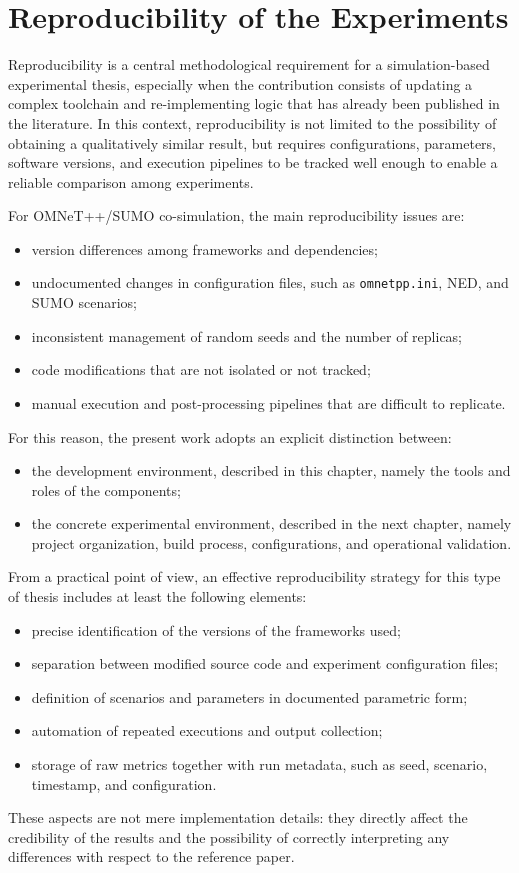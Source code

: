 \section{Reproducibility of the Experiments}
\label{env:reproducibility}

Reproducibility is a central methodological requirement for a simulation-based experimental thesis, especially when the contribution consists of updating a complex toolchain and re-implementing logic that has already been published in the literature. In this context, reproducibility is not limited to the possibility of obtaining a qualitatively similar result, but requires configurations, parameters, software versions, and execution pipelines to be tracked well enough to enable a reliable comparison among experiments.

For OMNeT++/SUMO co-simulation, the main reproducibility issues are:
\begin{itemize}
\item version differences among frameworks and dependencies;
\item undocumented changes in configuration files, such as \texttt{omnetpp.ini}, NED, and SUMO scenarios;
\item inconsistent management of random seeds and the number of replicas;
\item code modifications that are not isolated or not tracked;
\item manual execution and post-processing pipelines that are difficult to replicate.
\end{itemize}
For this reason, the present work adopts an explicit distinction between:
\begin{itemize}
\item the development environment, described in this chapter, namely the tools and roles of the components;
\item the concrete experimental environment, described in the next chapter, namely project organization, build process, configurations, and operational validation.
\end{itemize}

From a practical point of view, an effective reproducibility strategy for this type of thesis includes at least the following elements:
\begin{itemize}
\item precise identification of the versions of the frameworks used;
\item separation between modified source code and experiment configuration files;
\item definition of scenarios and parameters in documented parametric form;
\item automation of repeated executions and output collection;
\item storage of raw metrics together with run metadata, such as seed, scenario, timestamp, and configuration.
\end{itemize}
These aspects are not mere implementation details: they directly affect the credibility of the results and the possibility of correctly interpreting any differences with respect to the reference paper.

